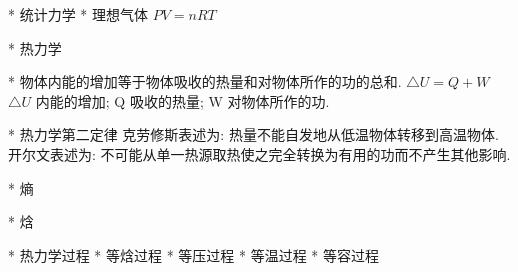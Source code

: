 * 统计力学
	* 理想气体
			$P V = n R T$

	* 热力学

		* 
				物体内能的增加等于物体吸收的热量和对物体所作的功的总和.
				$△U = Q + W$
				$△U$ 内能的增加; Q 吸收的热量; W 对物体所作的功.

		* 热力学第二定律
				克劳修斯表述为: 热量不能自发地从低温物体转移到高温物体. 
				开尔文表述为: 不可能从单一热源取热使之完全转换为有用的功而不产生其他影响.
				
			* 熵

		* 焓

		* 热力学过程
			* 等焓过程
			* 等压过程
			* 等温过程
			* 等容过程


